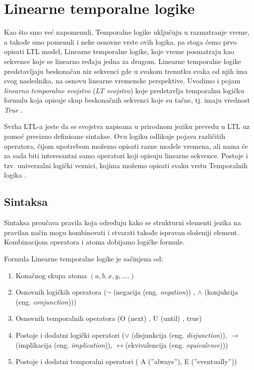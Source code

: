 \documentclass[a4paper]{article}
\begin{document}
{	\section{Linearne temporalne logike}
	\label{sec:LTL}

	Kao što smo već napomenuli, Temporalne logike uključuju u razmatranje vreme, a takođe smo pomenuli i neke osnovne vrste ovih logika, pa stoga ćemo prvo opisati LTL model, Linearne temporalne logike, koje vreme posmatraju kao sekvence koje se linearno ređaju jedna za drugom. Linearne temporalne logike predstavljaju beskonačan niz sekvenci gde u svakom trenutku svaka od njih ima svog naslednika, na osnovu linearne vremenske perspektive. Uvodimo i pojam \emph{linearno temporalno svojstvo} (\emph{LT svojstvo}) koje predstavlja temporalnu logičku formulu koja opisuje skup beskonačnih sekvenci koje su tačne, tj. imaju vrednost \emph{True} \cite{reeves1990logic}.

	Svrha LTL-a jeste da se svojstva napisana u prirodnom jeziku prevedu u LTL uz pomoć precizno definisane sintakse. Ovu logiku odlikuje pojava različitih operatora, čijom upotrebom možemo opisati razne modele vremena, ali nama će za sada biti interesantni samo operatori koji opisuju linearne sekvence. Postoje i tzv. univerzalni logički veznici, kojima možemo opisati svaku vrstu  Temporalnih logika \cite{reeves1990logic}.
	\subsection{Sintaksa}
	\label{subsec:podnaslovN}
	
Sintaksa proučava pravila koja određuju kako se strukturni elementi jezika na pravilan način mogu kombinovati i stvarati takođe ispravan složeniji element. Kombinacijom operatora i atoma dobijamo logičke formule.%

Formula Linearne temporalne logike je sačinjena od: 
\begin{enumerate}
\item  Konačnog skupa atoma $(a, b, x, y, ....)$
\item  Osnovnih logičkih operatora ($\neg$ (negacija (eng. \emph{negation})) , $\wedge$ (konjukcija (eng. \emph{conjunction}))) 
\item  Osnovnih temporalnih operatora (O (next) , U (until) , true) 
\item  Postoje i dodatni logički operatori ($\vee$ (disjunkcija (eng. \emph{disjunction})), $\rightarrow$(implikacija (eng. \emph{implication})), $\leftrightarrow$(ekvivalencija (eng. \emph{equivalence})))
\item  Postoje i dodatni temporalni operatori ( A (”always”), E (”eventually”))
\end{enumerate}

}
\end{document}
